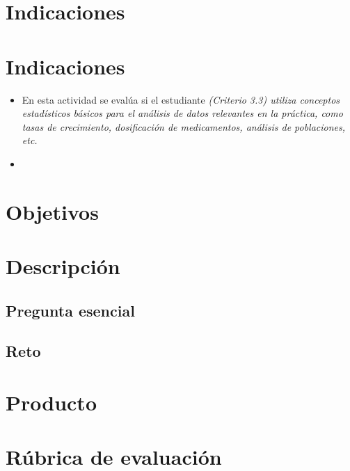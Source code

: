 \documentclass[a4,11pt]{aleph-notas}
\begin{document}
\encabezado

\vspace*{-10mm}
\section{Indicaciones}

\section*{Indicaciones}
\begin{itemize}[leftmargin=*]
\item 
    En esta actividad se evalúa si el estudiante \textit{(Criterio 3.3) utiliza conceptos estadísticos básicos para el análisis de datos relevantes en la práctica, como tasas de crecimiento, dosificación de medicamentos, análisis de poblaciones, etc.}
\item 
    
\end{itemize}


\section{Objetivos}


\section{Descripción}


\subsection{Pregunta esencial}


\subsection{Reto}


\section{Producto}



\section{Rúbrica de evaluación}
\end{document}
